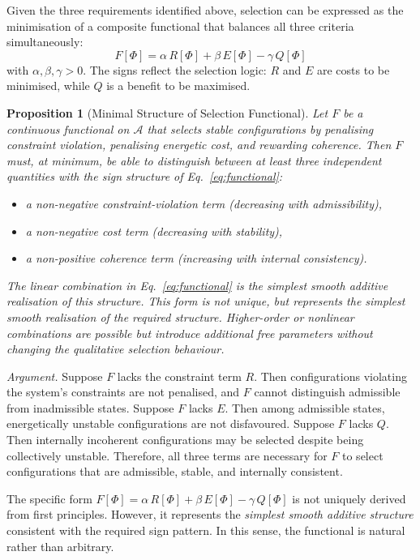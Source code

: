 \documentclass[12pt]{article}
\newtheorem{proposition}[theorem]{Proposition}
\begin{document}
Given the three requirements identified above, selection can be expressed as the minimisation of a composite functional that balances all three criteria simultaneously:
\begin{equation}\label{eq:functional}
    F[\Phi] = \alpha\, R[\Phi] + \beta\, E[\Phi] - \gamma\, Q[\Phi]
\end{equation}
with $\alpha, \beta, \gamma > 0$. The signs reflect the selection logic: $R$ and $E$ are costs to be minimised, while $Q$ is a benefit to be maximised.

\begin{proposition}[Minimal Structure of Selection Functional]\label{thm:minimal}
Let $F$ be a continuous functional on $\mathcal{A}$ that selects stable configurations by penalising constraint violation, penalising energetic cost, and rewarding coherence. Then $F$ must, at minimum, be able to distinguish between at least three independent quantities with the sign structure of Eq.~\eqref{eq:functional}:
\begin{itemize}
    \item a non-negative constraint-violation term (decreasing with admissibility),
    \item a non-negative cost term (decreasing with stability),
    \item a non-positive coherence term (increasing with internal consistency).
\end{itemize}
The linear combination in Eq.~\eqref{eq:functional} is the simplest smooth additive realisation of this structure. This form is not unique, but represents the simplest smooth realisation of the required structure. Higher-order or nonlinear combinations are possible but introduce additional free parameters without changing the qualitative selection behaviour.
\end{proposition}

\textit{Argument.} Suppose $F$ lacks the constraint term $R$. Then configurations violating the system's constraints are not penalised, and $F$ cannot distinguish admissible from inadmissible states. Suppose $F$ lacks $E$. Then among admissible states, energetically unstable configurations are not disfavoured. Suppose $F$ lacks $Q$. Then internally incoherent configurations may be selected despite being collectively unstable. Therefore, all three terms are necessary for $F$ to select configurations that are admissible, stable, and internally consistent.

The specific form $F[\Phi] = \alpha\, R[\Phi] + \beta\, E[\Phi] - \gamma\, Q[\Phi]$ is not uniquely derived from first principles. However, it represents the \textit{simplest smooth additive structure} consistent with the required sign pattern. In this sense, the functional is natural rather than arbitrary.
\end{document}
